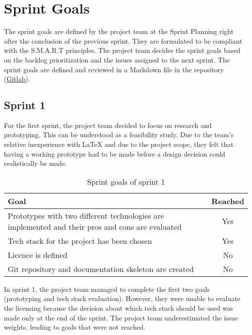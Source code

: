 \section{Sprint Goals}\label{sec:sprint-goals}
The sprint goals are defined by the project team at the Sprint Planning right after the conclusion of the previous sprint.
They are formulated to be compliant with the S.M.A.R.T principles.
The project team decides the sprint goals based on the backlog
prioritization and the issues assigned to the next sprint.
The sprint goals are defined and reviewed in a Markdown file in the repository (\href{https://gitlab.ti.bfh.ch/decibel-threshold-event-displayer/decibel-threshold-event-displayer/-/blob/main/doc/scrum/sprints.md}{Gitlab}).
\subsection{Sprint 1}\label{subsec:sprint-1}
For the first sprint, the project team decided to focus on research and prototyping.
This can be understood as a feasibility study.
Due to the team's relative inexperience with LaTeX and due to the project scope, they felt that having a working prototype had to be
made before a design decision could realistically be made. \\
\begin{table}[H]
    \centering
    \begin{tabularx}{\textwidth}{X c}
        \toprule
        \textbf{Goal}                                                                                    & \textbf{Reached} \\
        \midrule
        Prototypes with two different technologies are implemented and their pros and cons are evaluated & Yes              \\
        \midrule
        Tech stack for the project has been chosen                                                       & Yes              \\
        \midrule
        Licence is defined                                                                               & No               \\
        \midrule
        Git repository and documentation skeleton are created                                            & No               \\
        \bottomrule
    \end{tabularx}
    \caption{Sprint goals of sprint 1}\label{table:sprint_goals1}
\end{table}
In sprint 1, the project team managed to complete the first two goals (prototyping and tech stack evaluation).
However, they were unable to evaluate the licensing because the decision about which tech stack should be used was made only at the end of the sprint.
The project team underestimated the issue weights, leading to goals that were not reached.
